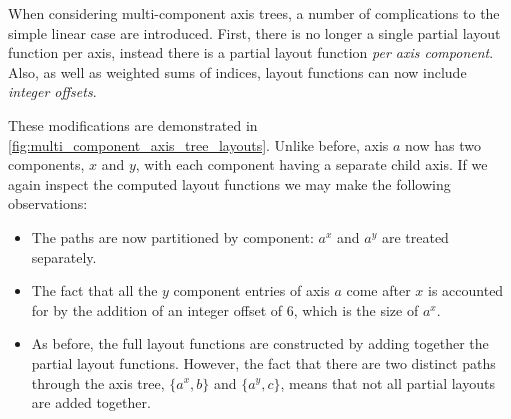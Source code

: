 \documentclass[thesis]{subfiles}
\begin{document}
When considering multi-component axis trees, a number of complications to the simple linear case are introduced.
First, there is no longer a single partial layout function per axis, instead there is a partial layout function \emph{per axis component}.
Also, as well as weighted sums of indices, layout functions can now include \emph{integer offsets}.

These modifications are demonstrated in \cref{fig:multi_component_axis_tree_layouts}.
Unlike before, axis $a$ now has two components, $x$ and $y$, with each component having a separate child axis.
If we again inspect the computed layout functions we may make the following observations:
\begin{itemize}
  \item
    The paths are now partitioned by component: $a^x$ and $a^y$ are treated separately.
  \item
    The fact that all the $y$ component entries of axis $a$ come after $x$ is accounted for by the addition of an integer offset of 6, which is the size of $a^x$.
  \item
    As before, the full layout functions are constructed by adding together the partial layout functions.
    However, the fact that there are two distinct paths through the axis tree, $\{a^x, b\}$ and $\{a^y, c\}$, means that not all partial layouts are added together.
\end{itemize}
\end{document}
